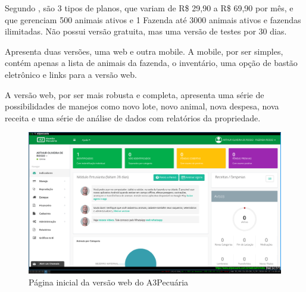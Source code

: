 \documentclass[12pt]{article}
\begin{document}
\begin{titlepage}
Segundo , são 3 tipos de planos, que variam de R\$ 29,90 a R\$ 69,90 por mês, e que gerenciam 500 animais ativos e 1 Fazenda até 3000 animais ativos e fazendas ilimitadas. Não possui versão gratuita, mas uma versão de testes por 30 dias.

Apresenta duas versões, uma web e outra mobile. A mobile, por ser simples, contém apenas a lista de animais da fazenda, o inventário, uma opção de bastão eletrônico e links para a versão web.

A versão web, por ser mais robusta e completa, apresenta uma série de possibilidades de manejos como novo lote, novo animal, nova despesa, nova receita e uma série de análise de dados com relatórios da propriedade.

\newpage

\begin{figure}[!h]
\begin{center}
\caption{Página inicial da versão web do A3Pecuária}
\includegraphics[width=6in]{img/a3pecuaria.png}

\end{center}
\end{figure}





\end{titlepage}
\end{document}
